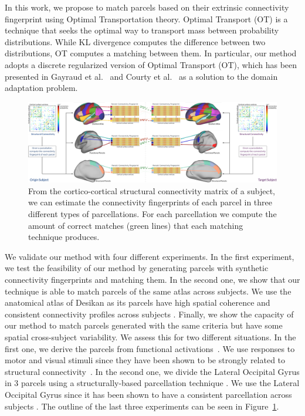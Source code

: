 In this work, we propose to match parcels based on their extrinsic connectivity fingerprint using Optimal Transportation theory. Optimal Transport (OT) is a technique that seeks the optimal way to transport mass between probability distributions. While KL divergence computes the difference between two distributions, OT computes a matching between them. In particular, our method adopts a discrete regularized version of Optimal Transport (OT), which has been presented in Gayraud et al.~\cite{nathalie} and Courty et al.~\cite{remi} as a solution to the domain adaptation problem.

\begin{figure}[t!]
\centering
\includegraphics[width=1\textwidth]{6.matching/img/method}
\caption{From the cortico-cortical structural connectivity matrix of a subject, we can estimate the connectivity fingerprints of each parcel in three different types of parcellations. For each parcellation we compute the amount of correct matches (green lines) that each matching technique produces.}
\label{fig:method}
\end{figure}

We validate our method with four different experiments. In the first experiment, we test the feasibility of our method by generating parcels with synthetic connectivity fingerprints and matching them. In the second one, we show that our technique is able to match parcels of the same atlas across subjects. We use the anatomical atlas of Desikan \cite{Desikan2006} as its parcels have high spatial coherence and consistent connectivity profiles across subjects \cite{DeReus2013}. Finally, we show the capacity of our method to match parcels generated with the same criteria but have some spatial cross-subject variability. We assess this for two different situations. In the first one, we derive the parcels from functional activations~\cite{Barch2013}. We use responses to motor and visual stimuli since they have been shown to be strongly related to structural connectivity~\cite{Osher2016, Penfield1954}. In the second one, we divide the Lateral Occipital Gyrus in 3 parcels using a structurally-based parcellation technique  \cite{Gallardo2017a}. We use the Lateral Occipital Gyrus since it has been shown to have a consistent parcellation across subjects \cite{ThiebautdeSchotten2016, Gallardo2017a}. The outline of the last three experiments can be seen in Figure~\ref{fig:method}.

